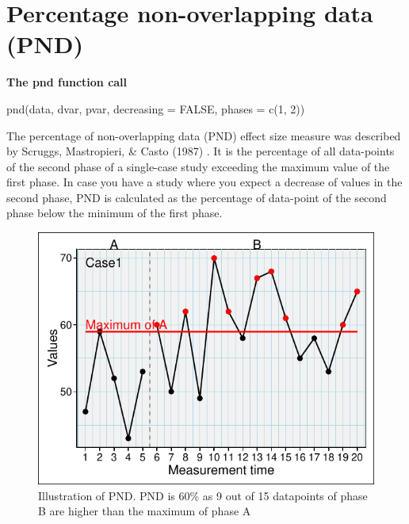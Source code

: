 \documentclass[
  letterpaper,
  DIV=11,
  numbers=noendperiod]{scrreprt}
\begin{document}
\hypertarget{percentage-non-overlapping-data-pnd}{%
\section{Percentage non-overlapping data
(PND)}\label{percentage-non-overlapping-data-pnd}}

\begin{tcolorbox}[enhanced jigsaw, breakable, rightrule=.15mm, bottomrule=.15mm, arc=.35mm, colback=white, colframe=quarto-callout-tip-color-frame, opacityback=0, leftrule=.75mm, toprule=.15mm, left=2mm]
\begin{minipage}[t]{5.5mm}
\textcolor{quarto-callout-tip-color}{\faLightbulb}
\end{minipage}%
\begin{minipage}[t]{\textwidth - 5.5mm}

\textbf{The pnd function call}\vspace{2mm}

pnd(data, dvar, pvar, decreasing = FALSE, phases = c(1, 2))

\end{minipage}%
\end{tcolorbox}

The percentage of non-overlapping data (PND) effect size measure was
described by Scruggs, Mastropieri, \& Casto (1987) . It is the
percentage of all data-points of the second phase of a single-case study
exceeding the maximum value of the first phase. In case you have a study
where you expect a decrease of values in the second phase, PND is
calculated as the percentage of data-point of the second phase below the
minimum of the first phase.

\begin{figure}

{\centering \includegraphics{./ch_overlapping_indices_files/figure-pdf/unnamed-chunk-9-1.pdf}

}

\caption{Illustration of PND. PND is 60\% as 9 out of 15 datapoints of
phase B are higher than the maximum of phase A}

\end{figure}
\end{document}
